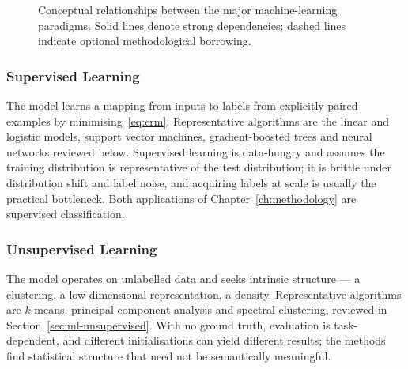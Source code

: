 \begin{figure}[htbp]
\centering
{}
\caption{Conceptual relationships between the major machine-learning paradigms. Solid lines denote strong dependencies; dashed lines indicate optional methodological borrowing.}%
\label{fig:ml_paradigms}
\end{figure}

\subsubsection{Supervised Learning}
The model learns a mapping from inputs to labels from explicitly paired
examples by minimising~\eqref{eq:erm}. Representative algorithms are the
linear and logistic models, support vector machines, gradient-boosted trees
and neural networks reviewed below. Supervised learning is data-hungry and
assumes the training distribution is representative of the test distribution;
it is brittle under distribution shift and label noise, and acquiring labels
at scale is usually the practical bottleneck. Both applications of
Chapter~\ref{ch:methodology} are supervised classification.

\subsubsection{Unsupervised Learning}
The model operates on unlabelled data and seeks intrinsic structure --- a
clustering, a low-dimensional representation, a density. Representative
algorithms are $k$-means, principal component analysis and spectral
clustering, reviewed in Section~\ref{sec:ml-unsupervised}. With no ground
truth, evaluation is task-dependent, and different initialisations can yield
different results; the methods find statistical structure that need not be
semantically meaningful.

